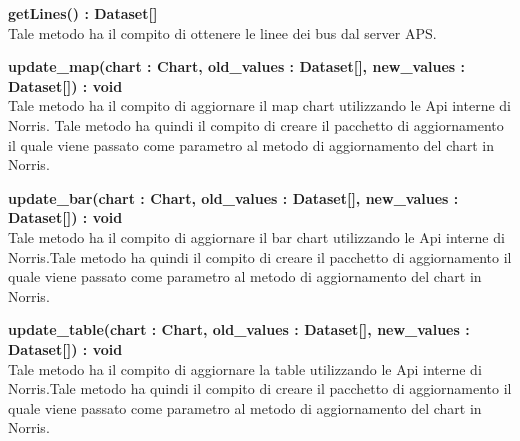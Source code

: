 \begin{description}
            \item \textbf{getLines() : Dataset[]} \\
            Tale metodo ha il compito di ottenere le linee dei bus dal server APS. 
            
            \item \textbf{update\_map(chart : Chart, old\_values : Dataset[], new\_values : Dataset[]) : void} \\
            Tale metodo ha il compito di aggiornare il map chart utilizzando le Api interne di Norris. Tale metodo ha quindi il compito di creare il pacchetto di aggiornamento il quale viene passato come parametro al metodo di aggiornamento del chart in Norris.
            
            \item \textbf{update\_bar(chart : Chart, old\_values : Dataset[], new\_values : Dataset[]) : void} \\
            Tale metodo ha il compito di aggiornare il bar chart utilizzando le Api interne di Norris.Tale metodo ha quindi il compito di creare il pacchetto di aggiornamento il quale viene passato come parametro al metodo di aggiornamento del chart in Norris.
            
            \item \textbf{update\_table(chart : Chart, old\_values : Dataset[], new\_values : Dataset[]) : void} \\
            Tale metodo ha il compito di aggiornare la table utilizzando le Api interne di Norris.Tale metodo ha quindi il compito di creare il pacchetto di aggiornamento il quale viene passato come parametro al metodo di aggiornamento del chart in Norris.

        \end{description}